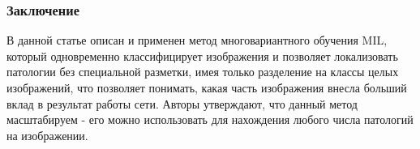 \subsubsection*{Заключение}
В данной статье описан и применен метод многовариантного обучения MIL, который одновременно 
классифицирует изображения и позволяет локализовать патологии без специальной разметки, 
имея только разделение на классы целых изображений, что позволяет понимать, какая 
часть изображения внесла больший вклад в результат работы сети.  Авторы утверждают, что данный метод масштабируем - 
его можно использовать для нахождения любого числа патологий на изображении.